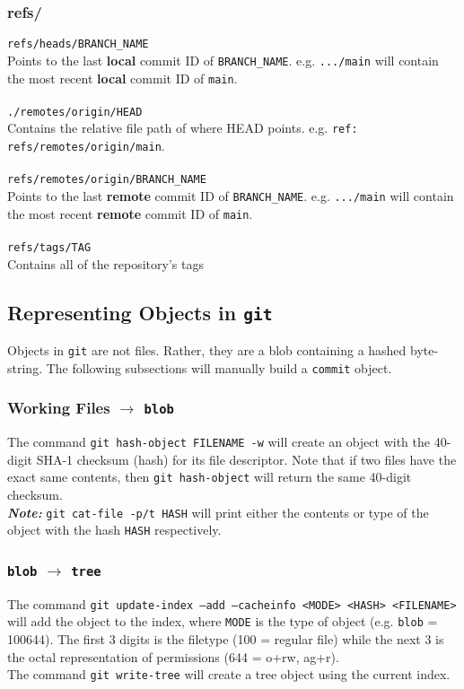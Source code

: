 \documentclass[13pt]{article}
\begin{document}
\subsubsection*{refs/}
\texttt{refs/heads/BRANCH\_NAME} \\
Points to the last \textbf{local} commit ID of \texttt{BRANCH\_NAME}. e.g. \texttt{.../main} will contain the most recent \textbf{local} commit ID of \texttt{main}. \\ \\
\texttt{./remotes/origin/HEAD} \\
Contains the relative file path of where HEAD points. e.g. \texttt{ref: refs/remotes/origin/main}. \\ \\
\texttt{refs/remotes/origin/BRANCH\_NAME} \\
Points to the last \textbf{remote} commit ID of \texttt{BRANCH\_NAME}. e.g. \texttt{.../main} will contain the most recent \textbf{remote} commit ID of \texttt{main}. \\ \\
\texttt{refs/tags/TAG} \\
Contains all of the repository's tags





\subsection{Representing Objects in \texttt{git}}
Objects in \texttt{git} are not files. Rather, they are a blob containing a hashed byte-string. The following subsections will manually build a \texttt{commit} object.

\subsubsection{Working Files $\rightarrow$ \texttt{blob}}
The command \texttt{git hash-object FILENAME -w} will create an object with the 40-digit SHA-1 checksum (hash) for its file descriptor. Note that if two files have the exact same contents, then \texttt{git hash-object} will return the same 40-digit checksum. \\
\textit{\textbf{Note:}} \texttt{git cat-file -p/t HASH} will print either the contents or type of the object with the hash \texttt{HASH} respectively.

\subsubsection{\texttt{blob} $\rightarrow$ \texttt{tree}}
The command \texttt{git update-index --add --cacheinfo <MODE> <HASH> <FILENAME>} will add the object to the index, where \texttt{MODE} is the type of object (e.g. \texttt{blob} = 100644). The first 3 digits is the filetype (100 = regular file) while the next 3 is the octal representation of permissions (644 = o+rw, ag+r). \\
The command \texttt{git write-tree} will create a tree object using the current index.
\end{document}
